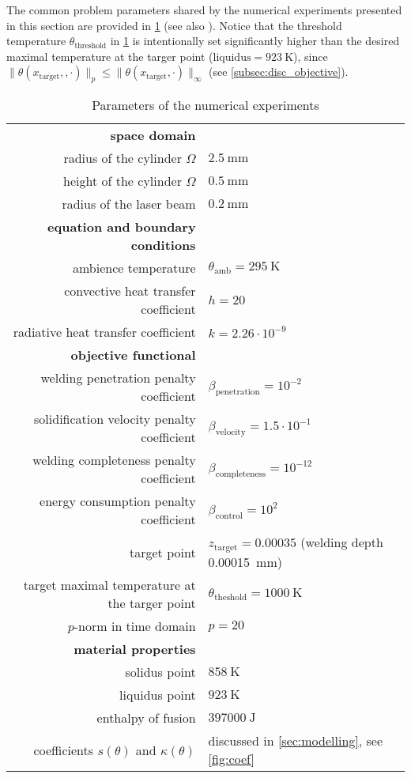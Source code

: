 The common problem parameters shared by the numerical experiments presented in this section are provided in \cref{tab:parameters} (see also \cite[\texttt{env/problem.py}]{optcontrol_github}). Notice that the threshold temperature $\theta_\text{threshold}$ in \cref{tab:parameters} is intentionally set significantly higher than the desired maximal temperature at the targer point ($\text{liquidus} = \SI{923}{\K}$), since
$\|\theta(x_\text{target}, , \cdot)\|_p \le \|\theta(x_\text{target}, \cdot)\|_\infty$ (see \cref{subsec:disc_objective}).

\begin{table}[ht]
	\begin{tabular}{rl}
		\textbf{space domain} \\
		radius of the cylinder $\Omega$ & $\SI{2.5}{\mm}$ \\
		height of the cylinder $\Omega$ & $\SI{0.5}{\mm}$ \\
		radius of the laser beam        & $\SI{0.2}{\mm}$\\[0.5em]

		\textbf{equation and boundary conditions} \\
		ambience temperature & $\theta_\text{amb} = \SI{295}{\K}$ \\
		convective heat transfer coefficient & $h = 20$ \\
		radiative heat transfer coefficient & $k = 2.26 \cdot 10^{-9}$\\[0.5em]

		\textbf{objective functional} \\
		welding penetration penalty coefficient & $\beta_\text{penetration} = 10^{-2}$ \\
		solidification velocity penalty coefficient & $\beta_\text{velocity} = 1.5 \cdot 10^{-1}$ \\
		welding completeness penalty coefficient & $\beta_\text{completeness} = 10^{-12}$ \\
		energy consumption penalty coefficient & $\beta_\text{control} = 10^{2}$ \\
		target point & $z_\text{target} = 0.00035$ (welding depth \SI{0.00015}{\mm}) \\
		target maximal temperature at the targer point & $\theta_\text{theshold} = \SI{1000}{\K}$ \\
		$p$-norm in time domain& $p = 20$\\[0.5em]

		\textbf{material properties} \\
		solidus point & $\SI{858}{\K}$ \\
		liquidus point & $\SI{923}{\K}$ \\
		enthalpy of fusion & $\SI{397000}{\J}$ \\
		coefficients $s(\theta)$ and $\kappa(\theta)$ & discussed in \cref{sec:modelling}, see \cref{fig:coef} \\
	\end{tabular}
	\caption{Parameters of the numerical experiments}
	\label{tab:parameters}
\end{table}

